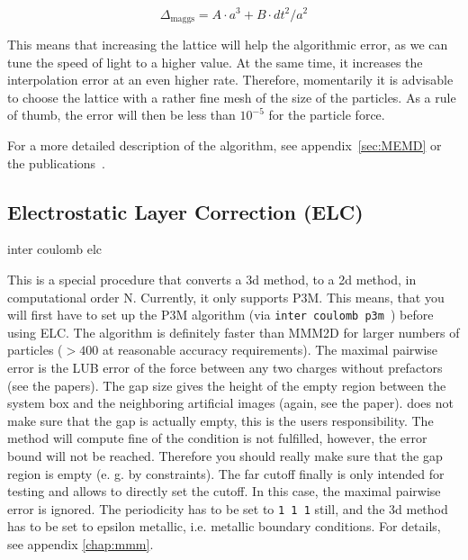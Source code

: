 \begin{equation}
\Delta_\text{maggs} = A\cdot a^3 + B\cdot dt^2/a^2
\end{equation}

This means that increasing the lattice will help the algorithmic
error, as we can tune the speed of light to a higher value. At the
same time, it increases the interpolation error at an even higher
rate. Therefore, momentarily it is advisable to choose the lattice
with a rather fine mesh of the size of the particles. As a rule of
thumb, the error will then be less than $10^{-5}$ for the particle
force.

For a more detailed description of the algorithm, see
appendix~\vref{sec:MEMD} or the publications~\cite{maggs02a,
  pasichnyk04a}.

\subsection{Electrostatic Layer Correction (ELC)}

\begin{essyntax}
  inter coulomb elc  
  \begin{features}
  \end{features}
\end{essyntax}
This is a special procedure that converts a 3d method, to a 2d method,
in computational order N. Currently, it only supports P3M. This means,
that you will first have to set up the P3M algorithm (via
\texttt{inter coulomb p3m }) before using ELC.  The
algorithm is definitely faster than MMM2D for larger numbers of
particles ($>400$ at reasonable accuracy requirements). The maximal
pairwise error is the LUB error of the force between any two charges
without prefactors (see the papers).  The gap size gives the height of
the empty region between the system box and the neighboring artificial
images (again, see the paper).  \es{} does not make sure that the gap
is actually empty, this is the users responsibility. The method will
compute fine of the condition is not fulfilled, however, the error
bound will not be reached. Therefore you should really make sure that
the gap region is empty (e. g. by constraints). The far cutoff finally
is only intended for testing and allows to directly set the cutoff. In
this case, the maximal pairwise error is ignored. The periodicity has
to be set to \texttt{1 1 1} still, and the 3d method has to be set to
epsilon metallic, i.e.  metallic boundary conditions. For details, see
appendix \vref{chap:mmm}.

